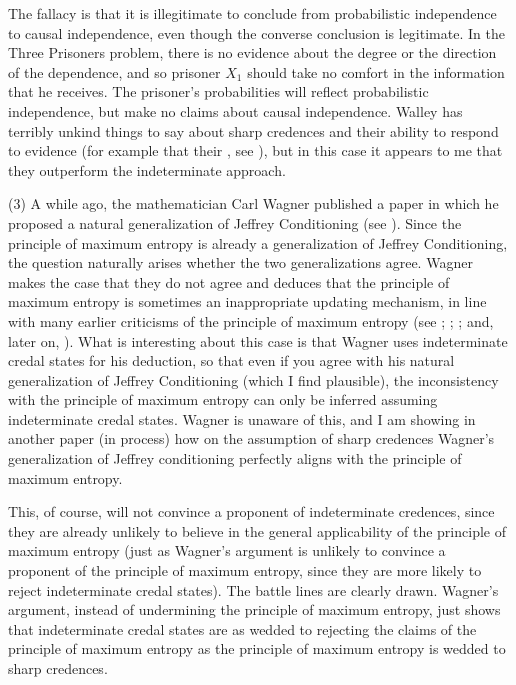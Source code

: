 The fallacy is that it is illegitimate to conclude from probabilistic independence to causal independence, even though the converse conclusion is legitimate. In the Three Prisoners problem, there is no evidence about the degree or the direction of the dependence, and so prisoner $X_{1}$ should take no comfort in the information that he receives. The prisoner's probabilities will reflect probabilistic independence, but make no claims about causal independence. Walley has terribly unkind things to say about sharp credences and their ability to respond to evidence (for example that their , see ), but in this case it appears to me that they outperform the indeterminate approach.

(3) A while ago, the mathematician Carl Wagner published a paper in which he proposed a natural generalization of Jeffrey Conditioning (see ). Since the principle of maximum entropy is already a generalization of Jeffrey Conditioning, the question naturally arises whether the two generalizations agree. Wagner makes the case that they do not agree and deduces that the principle of maximum entropy is sometimes an inappropriate updating mechanism, in line with many earlier criticisms of the principle of maximum entropy (see ; ; ; and, later on, ). What is interesting about this case is that Wagner uses indeterminate credal states for his deduction, so that even if you agree with his natural generalization of Jeffrey Conditioning (which I find plausible), the inconsistency with the principle of maximum entropy can only be inferred assuming indeterminate credal states. Wagner is unaware of this, and I am showing in another paper (in process) how on the assumption of sharp credences Wagner's generalization of Jeffrey conditioning perfectly aligns with the principle of maximum entropy.

This, of course, will not convince a proponent of indeterminate credences, since they are already unlikely to believe in the general applicability of the principle of maximum entropy (just as Wagner's argument is unlikely to convince a proponent of the principle of maximum entropy, since they are more likely to reject indeterminate credal states). The battle lines are clearly drawn. Wagner's argument, instead of undermining the principle of maximum entropy, just shows that indeterminate credal states are as wedded to rejecting the claims of the principle of maximum entropy as the principle of maximum entropy is wedded to sharp credences.

